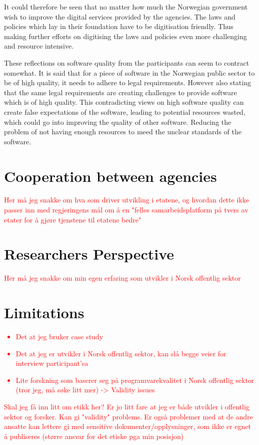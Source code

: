 It could therefore be seen that no matter how much the Norwegian government wish to improve the digital services provided by the agencies. The laws and policies which lay in their foundation have to be digitisation friendly. Thus making further efforts on digitising the laws and policies even more challenging and resource intensive.

These reflections on software quality from the participants can seem to contract somewhat. It is said that for a piece of software in the Norwegian public sector to be of high quality, it needs to adhere to legal requirements. However also stating that the same legal requirements are creating challenges to provide software which is of high quality. This contradicting views on high software quality can create false expectations of the software, leading to potential resources wasted, which could go into improving the quality of other software. Reducing the problem of not having enough resources to meed the unclear standards of the software.

\section{Cooperation between agencies}
\textcolor{red}{Her må jeg snakke om hva som driver utvikling i etatene, og hvordan dette ikke passer inn med regjeringens mål om å en "felles samarbeidsplatform på tvers av etater for å gjøre tjenstene til etatene bedre"}

\section{Researchers Perspective}
\textcolor{red}{Her må jeg snakke om min egen erfaring som utvikler i Norsk offentlig sektor}

\section{Limitations}
\textcolor{red}{\begin{itemize}
    \item Det at jeg bruker case study
    \item Det at jeg er utvikler i Norsk offentlig sektor, kan slå begge veier for interview participant'sa
    \item Lite forskning som baserer seg på programvarekvalitet i Norsk offentlig sektor (tror jeg, må søke litt mer) -> Validity issues
\end{itemize}}

\textcolor{red}{Skal jeg få inn litt om etikk her? Er jo litt fare at jeg er både utvikler i offentlig sektor og forsker. Kan gi "validity" problems. Er også problemer med at de andre ansatte kan lettere gi med sensitive dokumenter/opplysninger, som ikke er egnet å publiseres (større ansvar for det etiske pga min posisjon)}
